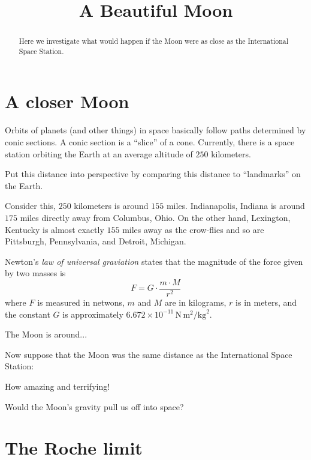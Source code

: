 \documentclass{ximera}
\title{A Beautiful Moon}
\begin{document}
\begin{abstract}
Here we investigate what would happen if the Moon were as close as the
International Space Station.
\end{abstract}
\maketitle

\section{A closer Moon}

Orbits of planets (and other things) in space basically follow paths
determined by conic sections. A conic section is a ``slice'' of a
cone. Currently, there is a space station orbiting the Earth at an average
altitude of $250$ kilometers.

\begin{question}
Put this distance into perspective by comparing this distance to
``landmarks'' on the Earth.
\begin{solution}
\begin{freeResponse}
Consider this, $250$ kilometers is around $155$ miles. Indianapolis,
Indiana is around $175$ miles directly away from Columbus, Ohio. On
the other hand, Lexington, Kentucky is almost exactly $155$ miles away
as the crow-flies and so are Pittsburgh, Pennsylvania, and Detroit,
Michigan.
\end{freeResponse}
\end{solution}
\end{question}


Newton's \textit{law of universal graviation} states that the
magnitude of the force given by two masses is
\[
F = G \cdot \frac{m\cdot M}{r^2} 
\]
where $F$ is measured in netwons, $m$ and $M$ are in kilograms, $r$ is
in meters, and the constant $G$ is approximately $6.672\times
10^{-11}\, \mathrm{N}\, \mathrm{m}^2/\mathrm{kg}^2$.

The Moon is around...


Now suppose that the Moon was the same distance as the International
Space Station: 

How amazing and terrifying!



\begin{question}
Would the Moon's gravity pull us off into space? 
\end{question}

\section{The Roche limit} %
\end{document}
